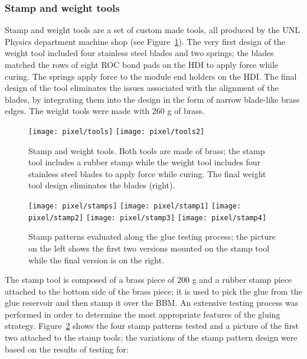 \subsubsection*{Stamp and weight tools}

Stamp and weight tools are a set of custom made tools, all produced by the UNL Physics department machine shop (see Figure~\ref{fig:st_wt}). The very first design of the weight tool included four stainless steel blades and two springs; the blades matched the rows of eight ROC bond pads on the HDI to apply force while curing. The springs apply force to the module end holders on the HDI. The final design of the tool eliminates the issues associated with the alignment of the blades, by integrating them into the design in the form of narrow blade-like brass edges. The weight tools were made with 260 g of brass.      

\begin{figure}[!h]
  \centering
  \texttt{[image: pixel/tools]}
  \texttt{[image: pixel/tools2]}
  \caption[Stamp and Weight tools]{Stamp and weight tools. Both tools are made of brass; the stamp tool includes a rubber stamp while the weight tool includes four stainless steel blades to apply force while curing. The final weight tool design eliminates the blades (right).}\label{fig:st_wt}
\end{figure}

\begin{figure}[!h]
  \centering  
  \texttt{[image: pixel/stamps]}
  \texttt{[image: pixel/stamp1]}
  \texttt{[image: pixel/stamp2]}
  \texttt{[image: pixel/stamp3]}
  \texttt{[image: pixel/stamp4]}
  \caption[Stamp patterns]{Stamp patterns evaluated along the glue testing process; the picture on the left shows the first two versions mounted on the stamp tool while the final version is on the right.}\label{fig:stamp_pattern}
\end{figure}

The stamp tool is composed of a brass piece of 200 g and a rubber stamp piece attached to the bottom side of the brass piece; it is used to pick the glue from the glue reservoir and then stamp it over the BBM. An extensive testing process was performed in order to determine the most appropriate features of the gluing strategy. Figure~\ref{fig:stamp_pattern} shows the four stamp patterns tested and a picture of the first two attached to the stamp tools; the variations of the stamp pattern design were based on the results of testing for:

